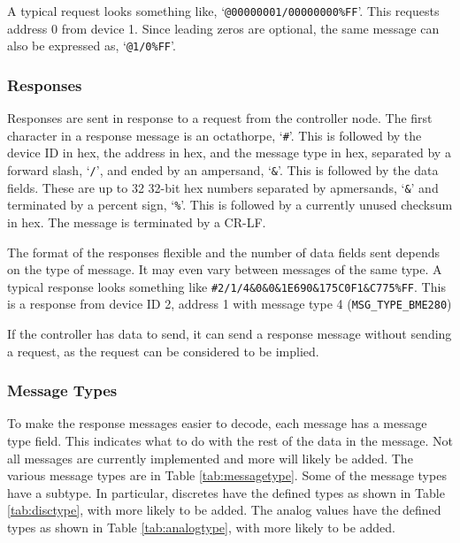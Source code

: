 \documentclass[10pt, openany, draft]{article}
\begin{document}
A typical request looks something like, `\texttt{@00000001/00000000\%FF}'.  This requests address 0 from device 1.  Since leading zeros are optional, the same message can also be expressed as, `\texttt{@1/0\%FF}'.

\subsubsection{Responses}
Responses are sent in response to a request from the controller node.  The first character in a response message is an octathorpe, `\texttt{\#}'.  This is followed by the device ID in hex, the address in hex, and the message type in hex, separated by a forward slash, `\texttt{/}', and ended by an ampersand, `\texttt{\&}'.  This is followed by the data fields.  These are up to 32 32-bit hex numbers separated by apmersands, `\texttt{\&}' and terminated by a percent sign, `\texttt{\%}'.  This is followed by a currently unused checksum in hex.  The message is terminated by a CR-LF.

The format of the responses flexible and the number of data fields sent depends on the type of message.  It may even vary between messages of the same type.  A typical response looks something like \texttt{\#2/1/4\&0\&0\&1E690\&175C0F1\&C775\%FF}.  This is a response from device ID 2, address 1 with message type 4 (\texttt{MSG\_TYPE\_BME280})

If the controller has data to send, it can send a response message without sending a request, as the request can be considered to be implied.

\subsubsection{Message Types}
To make the response messages easier to decode, each message has a message type field.  This indicates what to do with the rest of the data in the message.  Not all messages are currently implemented and more will likely be added.  The various message types are in Table \ref{tab:messagetype}.  Some of the message types have a subtype.  In particular, discretes have the defined types as shown in Table \ref{tab:disctype}, with more likely to be added.  The analog values have the defined types as shown in Table \ref{tab:analogtype}, with more likely to be added.
\end{document}
